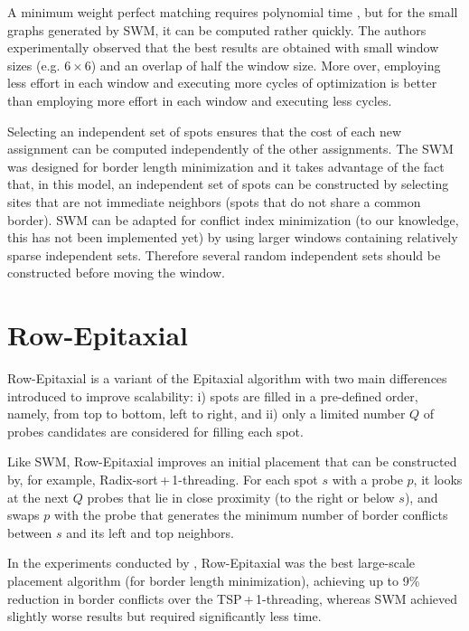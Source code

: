 A minimum weight perfect matching requires polynomial time \citep{Gross2004},
but for the small graphs generated by SWM, it can be computed rather quickly.
The authors experimentally observed that the best results are obtained with
small window sizes (e.g. $6\times 6$) and an overlap of half the window size.
More over, employing less effort in each window and executing more cycles of
optimization is better than employing more effort in each window and executing
less cycles.

Selecting an independent set of spots ensures that the cost of each new
assignment can be computed independently of the other assignments. The SWM was
designed for border length minimization and it takes advantage of the fact that,
in this model, an independent set of spots can be constructed by selecting sites
that are not immediate neighbors (spots that do not share a common border). SWM
can be adapted for conflict index minimization (to our knowledge, this has not
been implemented yet) by using larger windows containing relatively sparse
independent sets. Therefore several random independent sets should be
constructed before moving the window.

\section{Row-Epitaxial}
\label{sec:placement_reptx}

Row-Epitaxial \citep{Kahng2003} is a variant of the Epitaxial algorithm with two
main differences introduced to improve scalability: i) spots are filled in a
pre-defined order, namely, from top to bottom, left to right, and ii) only a
limited number $Q$ of probes candidates are considered for filling each spot.

Like SWM, Row-Epitaxial improves an initial placement that can be constructed
by, for example, Radix-sort\,+\,1-threading. For each spot $s$ with a probe $p$,
it looks at the next $Q$ probes that lie in close proximity (to the right or
below $s$), and swaps $p$ with the probe that generates the minimum number of
border conflicts between $s$ and its left and top neighbors.

In the experiments conducted by \citet{Kahng2003}, Row-Epitaxial was the best
large-scale placement algorithm (for border length minimization), achieving up
to 9\% reduction in border conflicts over the TSP\,+\,1-threading, whereas SWM
achieved slightly worse results but required significantly less time.

